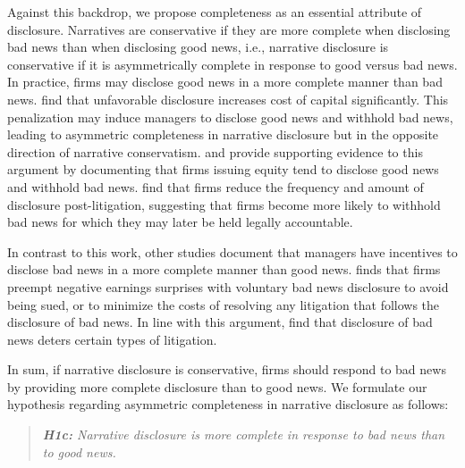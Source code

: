 \documentclass[letterpaper,12pt]{article}
\begin{document}
\begin{spacing}{1.5}
Against this backdrop, we propose completeness as an essential attribute of disclosure. Narratives are conservative if they are more complete when disclosing bad news than when disclosing good news, i.e., narrative disclosure is conservative if it is asymmetrically complete in response to good versus bad news. In practice, firms may disclose good news in a more complete manner than bad news.  find that unfavorable disclosure increases cost of capital significantly. This penalization may induce managers to disclose good news and withhold bad news, leading to asymmetric completeness in narrative disclosure but in the opposite direction of narrative conservatism.  and  provide supporting evidence to this argument by documenting that firms issuing equity tend to disclose good news and withhold bad news.  find that firms reduce the frequency and amount of disclosure post-litigation, suggesting that firms become more likely to withhold bad news for which they may later be held legally accountable. 

In contrast to this work, other studies document that managers have incentives to disclose bad news in a more complete manner than good news.  finds that firms preempt negative earnings surprises with voluntary bad news disclosure to avoid being sued, or to minimize the costs of resolving any litigation that follows the disclosure of bad news. In line with this argument,  find that disclosure of bad news deters certain types of litigation. 

In sum, if narrative disclosure is conservative, firms should respond to bad news by providing more complete disclosure than to good news. We formulate our hypothesis regarding asymmetric completeness in narrative disclosure as follows:

\begin{quote}\label{hyp:h1c}
\textit{\textbf{H1c:} Narrative disclosure is more complete in response to bad news than to good news.}
\end{quote}

\begin{comment}

\end{comment}
\end{spacing}
\end{document}
